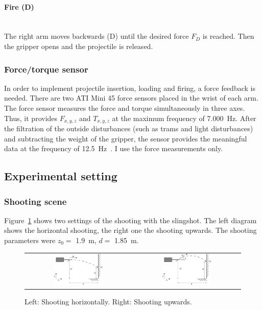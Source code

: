 			\paragraph{Fire (D)}~\\
				\indent The right arm moves backwards (D) until the desired force $ F_D$ is reached. Then the gripper opens and the projectile is released.

		\subsubsection{Force/torque sensor}
			In order to implement projectile insertion, loading and firing, a force feedback is needed. There are two ATI Mini 45 force sensors placed in the wrist of each arm. The force sensor measures the force and torque simultaneously in three axes. Thus, it provides $F_{x, y, z}$ and $T_{x,y,z}$ at the maximum frequency of \SI{7,000}{Hz}. After the filtration of the outside disturbances (such as trams and light disturbances) and subtracting the weight of the gripper, the sensor provides the meaningful data at the frequency of \SI{12.5}{Hz}~\cite{KubesForceSensor}. I use the force measurements only.
	
	
	\subsection{Experimental setting}

		\subsubsection{Shooting scene}
		
			Figure~\ref{fig:shooting setting} shows two settings of the shooting with the slingshot. The left diagram shows the horizontal shooting, the right one the shooting upwards. The shooting parameters were $z_0 = $ \SI{1.9}{m}, $ d = $ \SI{1.85}{m}.
			
			\begin{figure}[h]
			\centering
			\begin{tabular}{cc}
			\includegraphics[width=0.48\textwidth]{horizontal.png}
			&
			\includegraphics[width=0.48\textwidth]{askew.png}
			\end{tabular}
			\caption{Left: Shooting horizontally. Right: Shooting upwards.}
			\label{fig:shooting setting}
			\end{figure}
			
